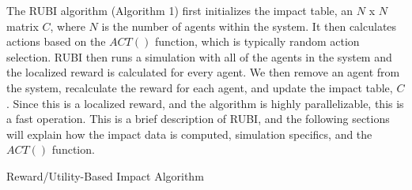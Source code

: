 \documentclass[smallcondensed]{svjour3}
\begin{document}
The RUBI algorithm (Algorithm 1) first initializes the impact table, an $N$ x $N$ matrix $C$, where $N$ is the number of agents within the system. It then calculates actions based on the $ACT()$ function, which is typically random action selection. RUBI then runs a simulation with all of the agents in the system and the localized reward is calculated for every agent. We then remove an agent from the system, recalculate the reward for each agent, and update the impact table, $C$. Since this is a localized reward, and the algorithm is highly parallelizable, this is a fast operation. This is a brief description of RUBI, and the following sections will explain how the impact data is computed, simulation specifics, and the $ACT()$ function.
\begin{algorithm} \label{alg:RUBI}
  \caption{Reward/Utility-Based Impact Algorithm}
  \begin{algorithmic}[1]
    \Statex
	    	
	           
				\EndFor
		\EndFor
	\EndFor      
    \EndFunction
  \end{algorithmic}
\end{algorithm}
\end{document}
